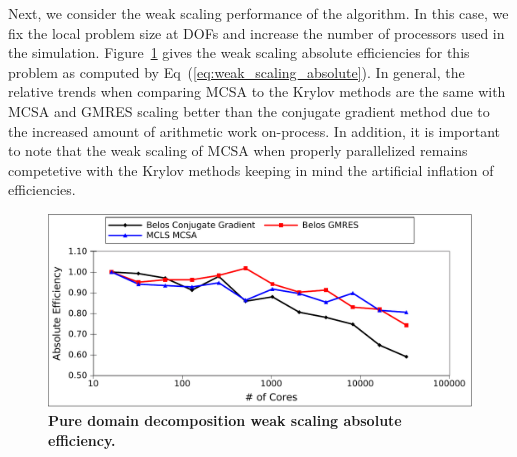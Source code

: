 Next, we consider the weak scaling performance of the algorithm. In
this case, we fix the local problem size at  DOFs and
increase the number of processors used in the
simulation. Figure~\ref{fig:titan_weak_absolute} gives the weak
scaling absolute efficiencies for this problem as computed by
Eq~(\ref{eq:weak_scaling_absolute}). In general, the relative trends
when comparing MCSA to the Krylov methods are the same with MCSA and
GMRES scaling better than the conjugate gradient method due to the
increased amount of arithmetic work on-process. In addition, it is
important to note that the weak scaling of MCSA when properly
parallelized remains competetive with the Krylov methods keeping in
mind the artificial inflation of efficiencies.

\begin{figure}[t!]
  \begin{center}
    \includegraphics[width=6in]{chapters/parallel_mc/titan_weak_absolute.pdf}
  \end{center}
  \caption{\textbf{Pure domain decomposition weak scaling absolute
      efficiency.}}
  \label{fig:titan_weak_absolute}
\end{figure}

